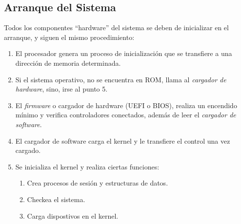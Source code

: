 \subsection{Arranque del Sistema}
\noindent Todos los componentes ``hardware'' del sistema se deben de inicializar en el arranque, y siguen el mismo procedimiento:
\begin{enumerate}
        \item El procesador genera un proceso de inicialización que se transfiere a una dirección de memoria determinada.
        \item Si el sistema operativo, no se encuentra en ROM, llama al \textit{cargador de hardware}, sino, irse al punto 5.
        \item El \textit{firmware} o cargador de hardware (UEFI o BIOS), realiza un encendido mínimo y verifica controladores conectados, además de leer el \textit{cargador de software}.
        \item El cargador de software carga el kernel y le transfiere el control una vez cargado.
        \item Se inicializa el kernel y realiza ciertas funciones:
              \begin{enumerate}
                      \item Crea procesos de sesión y estructuras de datos.
                      \item Checkea el sistema.
                      \item Carga dispostivos en el kernel.
              \end{enumerate}
\end{enumerate}
